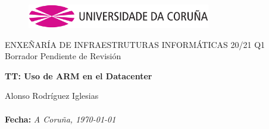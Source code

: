 \documentclass[a4paper,openright,12pt]{article}
\begin{document}
\clearpage

\begin{titlepage}

\begin{center}
\vspace*{-1in}
\vspace{3.5cm}
\begin{figure}[htb]
\begin{center}
\includegraphics[width=8cm]{img/udc.eps}
\end{center}
\end{figure}

\vspace*{1in}
\title {}
ENXEÑARÍA DE INFRAESTRUTURAS INFORMÁTICAS 20/21 Q1\\
Borrador Pendiente de Revisión\\
\vspace*{0.5in}
\begin{Large}
\textbf{TT: Uso de ARM en el Datacenter}\\
\end{Large}

\vspace*{10cm}

\begin{large}
\raggedleft{}
Alonso Rodríguez Iglesias\\

\textbf{\\Fecha:}\emph{ A Coruña, \today}\\
\end{large}

\end{center}
\end{titlepage} 

\newpage


%

\tableofcontents
\newpage
\end{document}
